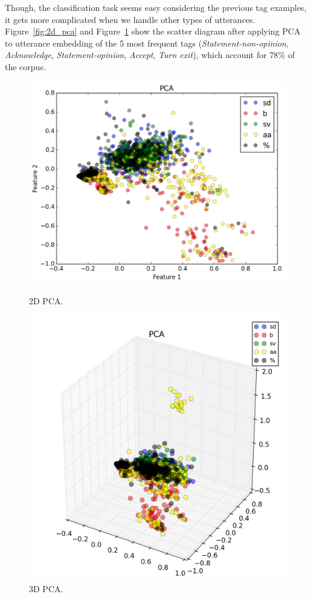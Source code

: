 Though, the classification task seems easy considering the previous tag examples, it gets more complicated when we handle other types of utterances. Figure~\ref{fig:2d_pca} and Figure~\ref{fig:3d_pca} show the scatter diagram after applying PCA to utterance embedding of the 5 most frequent tags (\emph{Statement-non-opinion}, \emph{Acknowledge}, \emph{Statement-opinion}, \emph{Accept}, \emph{Turn exit}), which account for $78\%$ of the corpus.

\begin{figure}
\centering
\begin{minipage}{.23\textwidth}
\includegraphics[width=1\textwidth]{img/complex_pca_2d}
\caption{2D PCA.}
\label{fig:2d_pca}
\end{minipage}
\begin{minipage}{.23\textwidth}
\includegraphics[width=1\textwidth]{img/complex_pca_3d}
\caption{3D PCA.}
\label{fig:3d_pca}
\end{minipage}
\end{figure}